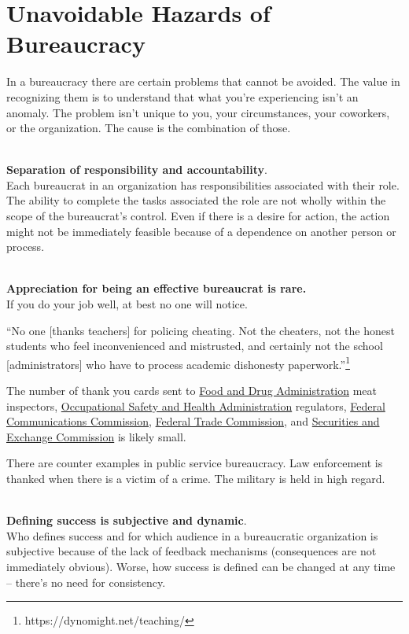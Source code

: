 \section{Unavoidable Hazards of Bureaucracy\label{sec:unavoidable_hazards}}

In a bureaucracy there are certain problems that cannot be avoided. The value in recognizing them is to understand that what you're experiencing isn't an anomaly. The problem isn't unique to you, your circumstances, your coworkers, or the organization. The cause is the combination of those.

\ \\

\textbf{Separation of responsibility and accountability}. \\
Each bureaucrat in an organization has responsibilities associated with their role. The ability to complete the tasks associated the role are not wholly within the scope of the bureaucrat's control. Even if there is a desire for action, the action might not be immediately feasible because of a dependence on another person or process. 

\ \\

\textbf{Appreciation for being an effective bureaucrat is rare.}\\
If you do your job well, at best no one will notice.

``No one [thanks teachers] for policing cheating. Not the cheaters, not the honest students who feel inconvenienced and mistrusted, and certainly not the school [administrators] who have to process academic dishonesty paperwork.''\footnote{https://dynomight.net/teaching/}

The number of thank you cards sent to \href{https://www.fda.gov/}{Food and Drug Administration} meat inspectors, \href{https://www.osha.gov/}{Occupational Safety and Health Administration} regulators, \href{https://www.fcc.gov/}{Federal Communications Commission}, \href{https://www.ftc.gov/}{Federal Trade Commission}, and \href{https://www.sec.gov/}{Securities and Exchange Commission} is likely small. 

There are counter examples in public service bureaucracy. 
Law enforcement is thanked when there is a victim of a crime. The military is held in high regard. 

\ \\

\textbf{Defining success is subjective and dynamic}. \\
Who defines success and for which audience in a bureaucratic organization is subjective because of the lack of feedback mechanisms (consequences are not immediately obvious). Worse, how success is defined can be changed at any time -- there's no need for consistency. 

